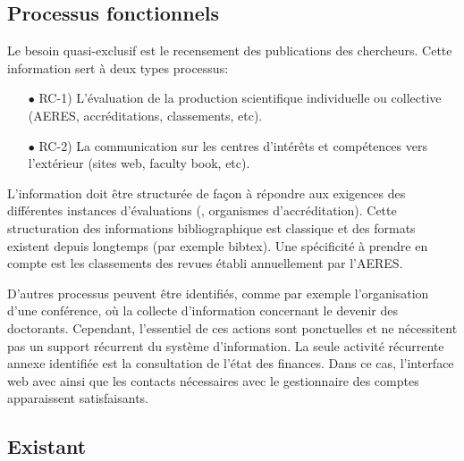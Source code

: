 \documentclass{book}
\begin{document}
\subsection{Processus fonctionnels}

Le besoin quasi-exclusif est le recensement des publications des chercheurs.
Cette information sert à deux types processus:
\begin{itemize}
\item[$\bullet$] RC-1) L'évaluation de la production scientifique individuelle ou 
collective (AERES, accréditations, classements, etc).
\item[$\bullet$] RC-2) La communication sur les centres d'intérêts et compétences 
vers l'extérieur (sites web, faculty book, etc).
\end{itemize}

\bigskip
L'information doit être structurée de façon à répondre aux exigences des 
différentes instances d'évaluations (, organismes d'accréditation).
Cette structuration des informations bibliographique est classique et des
formats existent depuis longtemps (par exemple bibtex). Une spécificité
à prendre en compte est les classements des revues établi annuellement par 
l'AERES.

D'autres processus peuvent être identifiés, comme par exemple l'organisation
d'une conférence, où la collecte d'information concernant le devenir des
doctorants. Cependant, l'essentiel de ces actions sont ponctuelles et ne 
nécessitent pas un support récurrent du système d'information. La seule 
activité récurrente annexe identifiée est la consultation de l'état des 
finances. Dans ce cas, l'interface web avec  ainsi que les 
contacts nécessaires avec le gestionnaire des comptes apparaissent satisfaisants.



\subsection{Existant}
\end{document}
